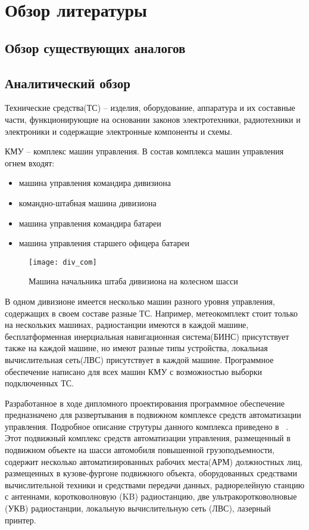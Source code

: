 \section{Обзор литературы}
\label{sec:lit_review}

\subsection{Обзор существующих аналогов}
\label{sub:lit_review:analogues}

\subsection{Аналитический обзор}
\label{sub:lit_review:analitics}
Технические средства(ТС) --  изделия, оборудование, аппаратура и их составные части, функционирующие на основании законов электротехники, радиотехники и электроники и содержащие электронные компоненты и схемы.

КМУ -- комплекс машин управления.
В состав комплекса машин управления огнем входят:
\begin{itemize}
    \item машина управления командира дивизиона
    \item командно-штабная машина дивизиона
    \item машина управления командира батареи
    \item машина управления старшего офицера батареи
\end{itemize}

\begin{figure}[ht]
	\centering
	\texttt{[image: div\_com]}
	\caption{Машина начальника штаба дивизиона на колесном шасси}
	\label{fig:lit_reiview:analytics:div_com}
\end{figure}
В одном дивизионе имеется несколько машин разного уровня управления, содержащих в своем составе разные ТС.
Например, метеокомплект стоит только на нескольких машинах, радиостанции имеются в каждой машине, бесплатформенная
инерциальная навигационная система(БИНС) присутствует также на каждой машине, но имеют разные типы устройства, локальная вычислительная сеть(ЛВС) присутствует в каждой машине.
Программное обеспечение написано для всех машин КМУ с возможностью выборки подключенных ТС.

Разработанное в ходе дипломного проектирования программное обеспечение предназначено для развертывания в подвижном комплексе средств автоматизации управления.
Подробное описание струтуры данного комплекса приведено в ~\cite{patent_2263960}.
Этот подвижный комплекс средств автоматизации управления, размещенный в подвижном объекте на шасси автомобиля повышенной
грузоподъемности, содержит несколько автоматизированных рабочих места(АРМ) должностных лиц, размещенных в кузове-фургоне
подвижного объекта, оборудованных средствами вычислительной техники и средствами передачи данных, радиорелейную станцию
с антеннами, коротковолновую (KB) радиостанцию, две ультракоротковолновые (УКВ) радиостанции, локальную вычислительную
сеть (ЛВС), лазерный принтер.

